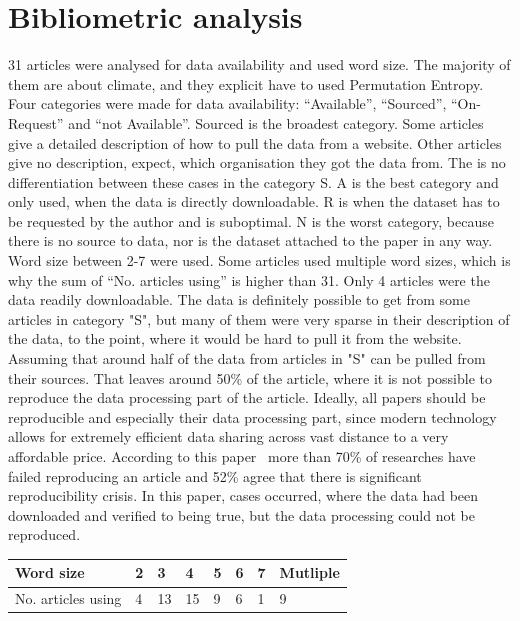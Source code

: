 \section{Bibliometric analysis}
31 articles were analysed for data availability and used word size. The majority of them are about climate, and they explicit have to used Permutation Entropy. Four categories were made for data availability: “Available”, “Sourced”, “On-Request” and “not Available”. Sourced is the broadest category. Some articles give a detailed description of how to pull the data from a website. Other articles give no description, expect, which organisation they got the data from. The is no differentiation between these cases in the category S. A is the best category and only used, when the data is directly downloadable. R is when the dataset has to be requested by the author and is suboptimal. N is the worst category, because there is no source to data, nor is the dataset attached to the paper in any way. Word size between 2-7 were used. Some articles used multiple word sizes, which is why the sum of “No. articles using” is higher than 31. Only 4 articles were the data readily downloadable. The data is definitely possible to get from some articles in category "S", but many of them were very sparse in their description of the data, to the point, where it would be hard to pull it from the website. Assuming that around half of the data from articles in "S" can be pulled from their sources. That leaves around 50\% of the article, where it is not possible to reproduce the data processing part of the article. Ideally, all papers should be reproducible and especially their data processing part, since modern technology allows for extremely efficient data sharing across vast distance to a very affordable price. According to this paper~\cite{Baker2016} more than 70\% of researches have failed reproducing an article and 52\% agree that there is significant reproducibility crisis. In this paper, cases occurred, where the data had been downloaded and verified to being true, but the data processing could not be reproduced.


\begin{table}[]
\begin{tabular}{|l|l|l|l|l|l|l|l|}
\hline
Word size & 2 & 3  & 4  & 5 & 6 & 7 & Mutliple \\ \hline
No. articles using  & 4 & 13 & 15 & 9 & 6 & 1 & 9        \\ \hline
\end{tabular}
\end{table}

